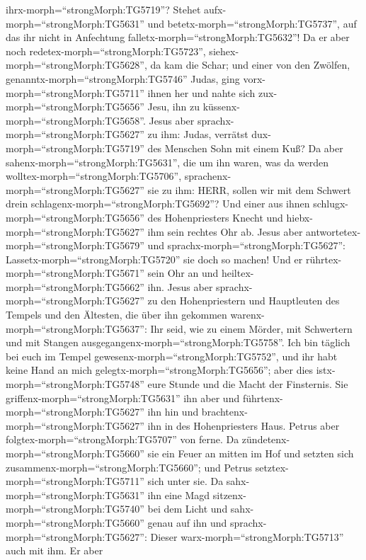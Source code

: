 ihrx-morph=``strongMorph:TG5719''? Stehet
aufx-morph=``strongMorph:TG5631'' und
betetx-morph=``strongMorph:TG5737'', auf das ihr nicht in Anfechtung
falletx-morph=``strongMorph:TG5632''!  Da er aber noch
redetex-morph=``strongMorph:TG5723'',
siehex-morph=``strongMorph:TG5628'', da kam die Schar; und einer von den
Zwölfen, genanntx-morph=``strongMorph:TG5746'' Judas, ging
vorx-morph=``strongMorph:TG5711'' ihnen her und nahte sich
zux-morph=``strongMorph:TG5656'' Jesu, ihn zu
küssenx-morph=``strongMorph:TG5658''.  Jesus aber
sprachx-morph=``strongMorph:TG5627'' zu ihm: Judas, verrätst
dux-morph=``strongMorph:TG5719'' des Menschen Sohn mit einem Kuß?
 Da aber sahenx-morph=``strongMorph:TG5631'', die um ihn
waren, was da werden wolltex-morph=``strongMorph:TG5706'',
sprachenx-morph=``strongMorph:TG5627'' sie zu ihm: HERR, sollen wir mit
dem Schwert drein schlagenx-morph=``strongMorph:TG5692''? 
Und einer aus ihnen schlugx-morph=``strongMorph:TG5656'' des
Hohenpriesters Knecht und hiebx-morph=``strongMorph:TG5627'' ihm sein
rechtes Ohr ab.  Jesus aber
antwortetex-morph=``strongMorph:TG5679'' und
sprachx-morph=``strongMorph:TG5627'':
Lassetx-morph=``strongMorph:TG5720'' sie doch so machen! Und er
rührtex-morph=``strongMorph:TG5671'' sein Ohr an und
heiltex-morph=``strongMorph:TG5662'' ihn.  Jesus aber
sprachx-morph=``strongMorph:TG5627'' zu den Hohenpriestern und
Hauptleuten des Tempels und den Ältesten, die über ihn gekommen
warenx-morph=``strongMorph:TG5637'': Ihr seid, wie zu einem Mörder, mit
Schwertern und mit Stangen ausgegangenx-morph=``strongMorph:TG5758''.
 Ich bin täglich bei euch im Tempel
gewesenx-morph=``strongMorph:TG5752'', und ihr habt keine Hand an mich
gelegtx-morph=``strongMorph:TG5656''; aber dies
istx-morph=``strongMorph:TG5748'' eure Stunde und die Macht der
Finsternis.  Sie griffenx-morph=``strongMorph:TG5631'' ihn
aber und führtenx-morph=``strongMorph:TG5627'' ihn hin und
brachtenx-morph=``strongMorph:TG5627'' ihn in des Hohenpriesters Haus.
Petrus aber folgtex-morph=``strongMorph:TG5707'' von ferne.
 Da zündetenx-morph=``strongMorph:TG5660'' sie ein Feuer an
mitten im Hof und setzten sich zusammenx-morph=``strongMorph:TG5660'';
und Petrus setztex-morph=``strongMorph:TG5711'' sich unter sie.
 Da sahx-morph=``strongMorph:TG5631'' ihn eine Magd
sitzenx-morph=``strongMorph:TG5740'' bei dem Licht und
sahx-morph=``strongMorph:TG5660'' genau auf ihn und
sprachx-morph=``strongMorph:TG5627'': Dieser
warx-morph=``strongMorph:TG5713'' auch mit ihm.  Er aber
